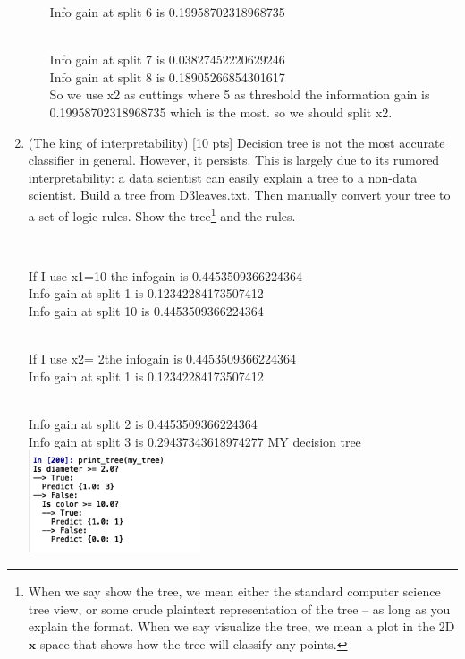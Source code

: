 \documentclass[a4paper]{article}
\theoremstyle{definition}
\def\x{\mathbf x}
\begin{document}
\begin{enumerate}
\begin{itemize}
Info gain at split 6 is 0.19958702318968735

\\

Info gain at split 7 is 0.03827452220629246 
\\

Info gain at split 8 is 0.18905266854301617 
\\
So  we use x2 as cuttings where  5 as threshold   the information gain is  0.19958702318968735 which is the most.
so we should split x2.
\end{itemize}




\item (The king of interpretability)  [10 pts] Decision tree is not the most accurate classifier in general.  However, it persists.  This is largely due to its rumored interpretability: a data scientist can easily explain a tree to a non-data scientist.  Build a tree from D3leaves.txt.  Then manually convert your tree to a set of logic rules.  Show the tree\footnote{When we say show the tree, we mean either the standard computer science tree view, or some crude plaintext representation of the tree -- as long as you explain the format.  When we say visualize the tree, we mean a plot in the 2D $\x$ space that shows how the tree will classify any points.} and the rules.





\\
\begin{itemize}
\color{blue}

If I use x1=10 the infogain is 0.4453509366224364
\\
Info gain at split 1 is 0.12342284173507412  
\\
Info gain at split 10 is 0.4453509366224364 

\\


  
If I use x2= 2the infogain is 0.4453509366224364 
\\
Info gain at split 1 is 0.12342284173507412 

\\
Info gain at split 2 is 0.4453509366224364 
 \\
 Info gain at split 3 is 0.29437343618974277 
 MY decision tree
\\
\includegraphics[width=0.4\textwidth]{1.png}





\end{itemize}
\end{enumerate}
\end{document}
